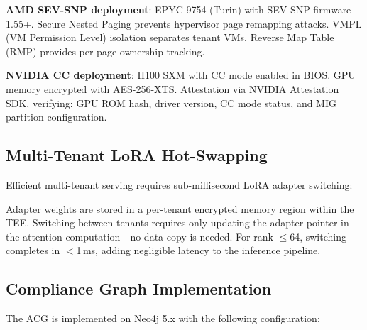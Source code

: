 \documentclass[conference,10pt]{IEEEtran}
\begin{document}
\textbf{AMD SEV-SNP deployment}: EPYC 9754 (Turin) with SEV-SNP firmware 1.55+. Secure Nested Paging prevents hypervisor page remapping attacks. VMPL (VM Permission Level) isolation separates tenant VMs. Reverse Map Table (RMP) provides per-page ownership tracking.

\textbf{NVIDIA CC deployment}: H100 SXM with CC mode enabled in BIOS. GPU memory encrypted with AES-256-XTS. Attestation via NVIDIA Attestation SDK, verifying: GPU ROM hash, driver version, CC mode status, and MIG partition configuration.

\subsection{Multi-Tenant LoRA Hot-Swapping}

Efficient multi-tenant serving requires sub-millisecond LoRA adapter switching:

\begin{table}[!htbp]
\caption{LoRA Adapter Switching Performance}
\label{tab:lora}
\centering\scriptsize
{}
\end{table}

Adapter weights are stored in a per-tenant encrypted memory region within the TEE. Switching between tenants requires only updating the adapter pointer in the attention computation---no data copy is needed. For rank $\leq$64, switching completes in $<$1\,ms, adding negligible latency to the inference pipeline.

\subsection{Compliance Graph Implementation}

The ACG is implemented on Neo4j 5.x with the following configuration:
\end{document}
